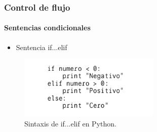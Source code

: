\begin{frame}[fragile]
  \frametitle{Control de flujo}

    \framesubtitle{Sentencias condicionales}    


  \begin{itemize}
    \item Sentencia if...elif
  \end{itemize}

  \begin{figure}
    \includegraphics[width=0.6\textwidth]{Imagenes/IfElif.jpg}
    \caption{\label{fig:Ejemplo6}Sintaxis de if...elif en Python.}
  \end{figure}

\end{frame}
